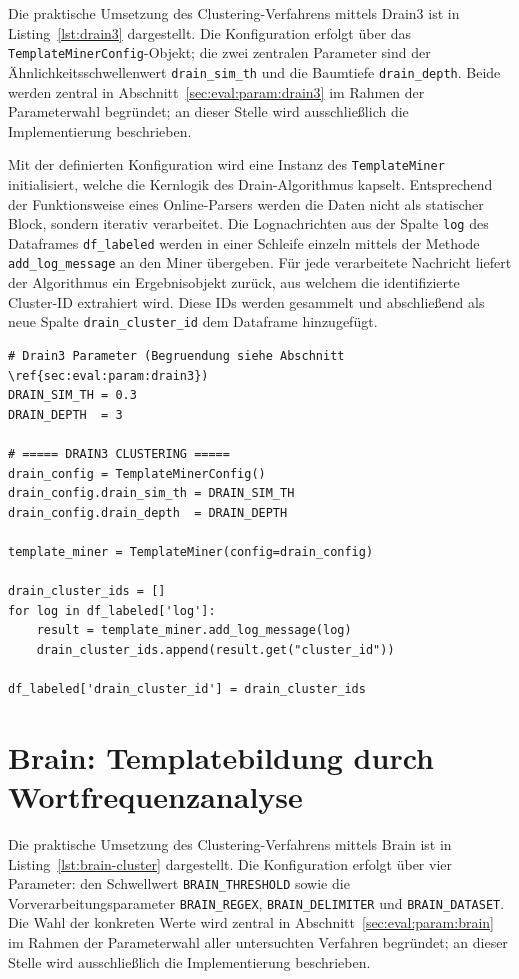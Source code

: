 Die praktische Umsetzung des Clustering-Verfahrens mittels Drain3 ist in
Listing~\ref{lst:drain3} dargestellt. Die Konfiguration erfolgt über das
\texttt{TemplateMinerConfig}-Objekt; die zwei zentralen Parameter sind der
Ähnlichkeitsschwellenwert \texttt{drain\_sim\_th} und die Baumtiefe
\texttt{drain\_depth}. Beide werden zentral in
Abschnitt~\ref{sec:eval:param:drain3} im Rahmen der Parameterwahl begründet;
an dieser Stelle wird ausschließlich die Implementierung beschrieben.

Mit der definierten Konfiguration wird eine Instanz des
\texttt{TemplateMiner} initialisiert, welche die Kernlogik des
Drain-Algorithmus kapselt. Entsprechend der Funktionsweise eines
Online-Parsers werden die Daten nicht als statischer Block, sondern iterativ
verarbeitet. Die Lognachrichten aus der Spalte \texttt{log} des Dataframes
\lstinline{df_labeled} werden in einer Schleife einzeln mittels der Methode
\lstinline{add_log_message} an den Miner übergeben. Für jede verarbeitete
Nachricht liefert der Algorithmus ein Ergebnisobjekt zurück, aus welchem die
identifizierte Cluster-ID extrahiert wird. Diese IDs werden gesammelt und
abschließend als neue Spalte \lstinline{drain_cluster_id} dem Dataframe
hinzugefügt.

\begin{lstlisting}[caption={Clustern mit Drain3}, label={lst:drain3}]
# Drain3 Parameter (Begruendung siehe Abschnitt \ref{sec:eval:param:drain3})
DRAIN_SIM_TH = 0.3
DRAIN_DEPTH  = 3

# ===== DRAIN3 CLUSTERING =====
drain_config = TemplateMinerConfig()
drain_config.drain_sim_th = DRAIN_SIM_TH
drain_config.drain_depth  = DRAIN_DEPTH

template_miner = TemplateMiner(config=drain_config)

drain_cluster_ids = []
for log in df_labeled['log']:
    result = template_miner.add_log_message(log)
    drain_cluster_ids.append(result.get("cluster_id"))

df_labeled['drain_cluster_id'] = drain_cluster_ids
\end{lstlisting}

\section{Brain: Templatebildung durch Wortfrequenzanalyse}
\label{sec:real:brain}

Die praktische Umsetzung des Clustering-Verfahrens mittels Brain ist in
Listing~\ref{lst:brain-cluster} dargestellt. Die Konfiguration erfolgt über
vier Parameter: den Schwellwert \texttt{BRAIN\_THRESHOLD} sowie die
Vorverarbeitungsparameter \texttt{BRAIN\_REGEX}, \texttt{BRAIN\_DELIMITER} und
\texttt{BRAIN\_DATASET}. Die Wahl der konkreten Werte wird zentral in
Abschnitt~\ref{sec:eval:param:brain} im Rahmen der Parameterwahl aller
untersuchten Verfahren begründet; an dieser Stelle wird ausschließlich die
Implementierung beschrieben.

